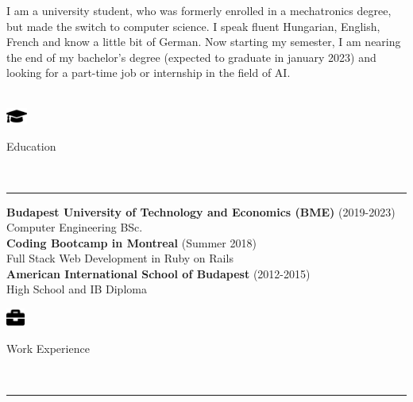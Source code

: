 \documentclass{article}
\begin{document}
\vspace{2mm}
I am a university student, who was formerly enrolled in a mechatronics degree, but made the switch to computer science. I speak fluent Hungarian, English, French and know a little bit of German. Now starting my  semester, I am nearing the end of my bachelor's degree (expected to graduate in january 2023) and looking for a part-time job or internship in the field of AI.  \\
\vspace{5mm} \\
\begin{minipage}[c]{7mm}
    \includegraphics[width=7mm]{../images/graduation-cap-solid.pdf}
\end{minipage}
\begin{minipage}[c]{100mm}
    {\large{Education}}
\end{minipage} \\
\hrule
\bigskip

\noindent
\textbf{Budapest University of Technology and Economics (BME)} \hspace{3mm} \color{gray} (2019-2023) \color{black} \\
Computer Engineering BSc.
\smallskip \\

\noindent
\textbf{Coding Bootcamp in Montreal} \hspace{3mm} \color{gray} (Summer 2018) \color{black} \\
Full Stack Web Development in Ruby on Rails
\smallskip \\

\noindent
\textbf{American International School of Budapest} \hspace{3mm} \color{gray} (2012-2015) \color{black} \\
High School and IB Diploma
\vspace{5mm}

\noindent
\begin{minipage}[c]{7mm}
    \includegraphics[width=6mm]{../images/briefcase-solid.pdf}
\end{minipage}
\begin{minipage}[c]{100mm}
    {\large{Work Experience}}
\end{minipage} \\
\hrule
\bigskip
\end{document}
